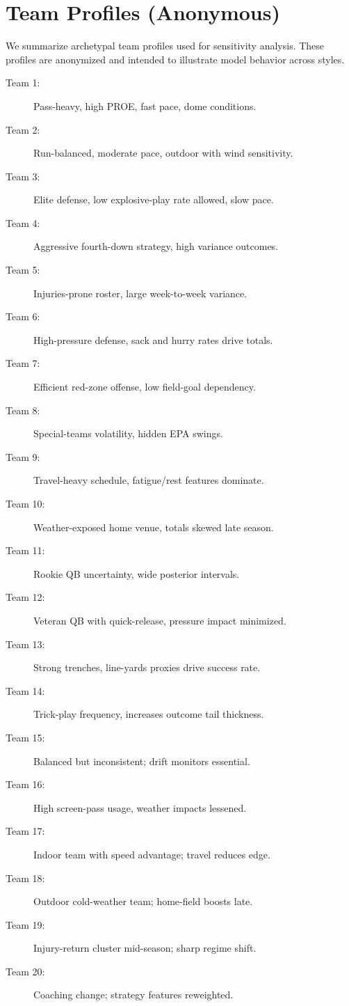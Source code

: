 \documentclass[12pt]{report}  %
\numberwithin{equation}{section}
\theoremstyle{plain}
\theoremstyle{definition}
\theoremstyle{remark}
\begin{document}
\chapter{Team Profiles (Anonymous)}
We summarize archetypal team profiles used for sensitivity analysis. These profiles are anonymized and intended to illustrate model behavior across styles.
\begin{description}
  \item[Team 1:] Pass-heavy, high PROE, fast pace, dome conditions.
  \item[Team 2:] Run-balanced, moderate pace, outdoor with wind sensitivity.
  \item[Team 3:] Elite defense, low explosive-play rate allowed, slow pace.
  \item[Team 4:] Aggressive fourth-down strategy, high variance outcomes.
  \item[Team 5:] Injuries-prone roster, large week-to-week variance.
  \item[Team 6:] High-pressure defense, sack and hurry rates drive totals.
  \item[Team 7:] Efficient red-zone offense, low field-goal dependency.
  \item[Team 8:] Special-teams volatility, hidden EPA swings.
  \item[Team 9:] Travel-heavy schedule, fatigue/rest features dominate.
  \item[Team 10:] Weather-exposed home venue, totals skewed late season.
  \item[Team 11:] Rookie QB uncertainty, wide posterior intervals.
  \item[Team 12:] Veteran QB with quick-release, pressure impact minimized.
  \item[Team 13:] Strong trenches, line-yards proxies drive success rate.
  \item[Team 14:] Trick-play frequency, increases outcome tail thickness.
  \item[Team 15:] Balanced but inconsistent; drift monitors essential.
  \item[Team 16:] High screen-pass usage, weather impacts lessened.
  \item[Team 17:] Indoor team with speed advantage; travel reduces edge.
  \item[Team 18:] Outdoor cold-weather team; home-field boosts late.
  \item[Team 19:] Injury-return cluster mid-season; sharp regime shift.
  \item[Team 20:] Coaching change; strategy features reweighted.

\end{description}
\end{document}
